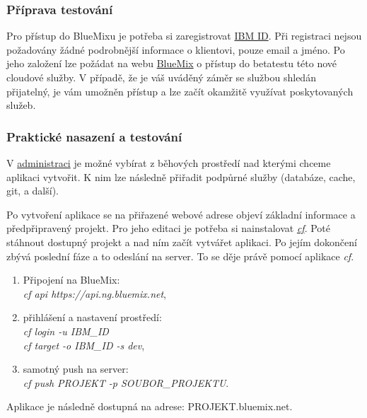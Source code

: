 \subsubsection{Příprava testování}
Pro přístup do BlueMixu je potřeba si zaregistrovat \href{https://www.ibm.com/account/profile}{IBM ID}. Při registraci nejsou požadovány žádné podrobnější informace o klientovi, pouze email a jméno. Po jeho založení lze požádat na webu \href{https://ace.ng.bluemix.net}{BlueMix\cite{bluemix:web}} o přístup do betatestu této nové cloudové služby. V případě, že je váš uváděný záměr se službou shledán přijatelný, je vám umožněn přístup a lze začít okamžitě využívat poskytovaných služeb.

\subsubsection{Praktické nasazení a testování}
V \href{https://ace.ng.bluemix.net/#/resources}{administraci} je možné vybírat z běhových prostředí nad kterými chceme aplikaci vytvořit. K nim lze následně přiřadit podpůrné služby (databáze, cache, git, a další).

Po vytvoření aplikace se na přiřazené webové adrese objeví základní informace a předpřipravený projekt. Pro jeho editaci je potřeba si nainstalovat \href{https://www.ng.bluemix.net/docs/BuildingWeb.jsp#install-cf}{\textit{cf}}. Poté stáhnout dostupný projekt a nad ním začít vytvářet aplikaci. Po jejím dokončení zbývá poslední fáze a to odeslání na server. To se děje právě pomocí aplikace \textit{cf}.
\begin{enumerate}
	\item Připojení na BlueMix:\\
		\textit{cf api https://api.ng.bluemix.net},
	\item přihlášení a nastavení prostředí:\\
		\textit{cf login -u IBM\_ID}\\
		\textit{cf target -o IBM\_ID -s dev},
	\item samotný push na server:\\
		\textit{cf push PROJEKT -p SOUBOR\_PROJEKTU}.
\end{enumerate}

Aplikace je následně dostupná na adrese: PROJEKT.bluemix.net.

